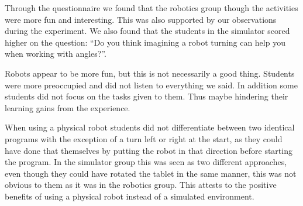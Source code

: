\bigskip\noindent
Through the questionnaire we found that the robotics group though the activities were more fun and interesting. This was also supported by our observations during the experiment. We also found that the students in the simulator scored higher on the question: ``Do you think imagining a robot turning can help you
when working with angles?''. 

\bigskip\noindent
Robots appear to be more fun, but this is not necessarily a good thing. Students were more preoccupied and did not listen to everything we said. In addition some students did not focus on the tasks given to them. Thus maybe hindering their learning gains from the experience. 

\bigskip\noindent
When using a physical robot students did not differentiate between two identical programs with the exception of a turn left or right at the start, as they could have done that themselves by putting the robot in that direction before starting the program. In the simulator group this was seen as two different approaches, even though they could have rotated the tablet in the same manner, this was not obvious to them as it was in the robotics group. This attests to the positive benefits of using a physical robot instead of a simulated environment. 